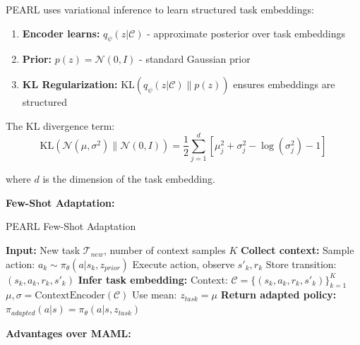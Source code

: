 \documentclass[12pt]{article}
\newcommand{\ieee}[1]{\textcolor{IEEEBlue}{\textbf{#1}}}
\begin{document}
{{			PEARL uses variational inference to learn structured task embeddings:
			
			\begin{enumerate}
				\item \textbf{Encoder learns:} $q_\psi(z|\mathcal{C})$ - approximate posterior over task embeddings
				\item \textbf{Prior:} $p(z) = \mathcal{N}(0, I)$ - standard Gaussian prior
				\item \textbf{KL Regularization:} $\text{KL}(q_\psi(z|\mathcal{C}) \| p(z))$ ensures embeddings are structured
			\end{enumerate}
			
			The KL divergence term:
			\begin{equation}
			\text{KL}(\mathcal{N}(\mu, \sigma^2) \| \mathcal{N}(0, I)) = \frac{1}{2} \sum_{j=1}^d \left[ \mu_j^2 + \sigma_j^2 - \log(\sigma_j^2) - 1 \right]
			\end{equation}
			
			where $d$ is the dimension of the task embedding.
			
			\ieee{Few-Shot Adaptation:}
			
			\begin{algorithm}[H]
			\caption{PEARL Few-Shot Adaptation}
			\begin{algorithmic}[1]
			\STATE \textbf{Input:} New task $\mathcal{T}_{new}$, number of context samples $K$
			\STATE \textbf{Collect context:}
			\STATE Sample action: $a_k \sim \pi_\theta(a|s_k, z_{prior})$ 
			\STATE Execute action, observe $s'_{k}, r_k$
			\STATE Store transition: $(s_k, a_k, r_k, s'_{k})$
			\ENDFOR
			\STATE \textbf{Infer task embedding:}
			\STATE Context: $\mathcal{C} = \{(s_k, a_k, r_k, s'_{k})\}_{k=1}^K$
			\STATE $\mu, \sigma = \text{ContextEncoder}(\mathcal{C})$
			\STATE Use mean: $z_{task} = \mu$ 
			\STATE \textbf{Return adapted policy:}
			\STATE $\pi_{adapted}(a|s) = \pi_\theta(a|s, z_{task})$
			\end{algorithmic}
			\end{algorithm}
			
			\ieee{Advantages over MAML:}
			
}}
\end{document}
